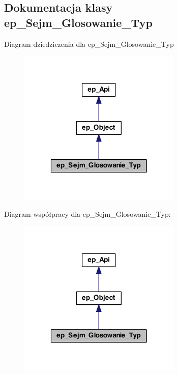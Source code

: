 \hypertarget{classep___sejm___glosowanie___typ}{\subsection{Dokumentacja klasy ep\-\_\-\-Sejm\-\_\-\-Glosowanie\-\_\-\-Typ}
\label{classep___sejm___glosowanie___typ}
}


Diagram dziedziczenia dla ep\-\_\-\-Sejm\-\_\-\-Glosowanie\-\_\-\-Typ\nopagebreak
\begin{figure}[H]
\begin{center}
\leavevmode
\includegraphics[width=220pt]{classep___sejm___glosowanie___typ__inherit__graph}
\end{center}
\end{figure}


Diagram współpracy dla ep\-\_\-\-Sejm\-\_\-\-Glosowanie\-\_\-\-Typ\-:\nopagebreak
\begin{figure}[H]
\begin{center}
\leavevmode
\includegraphics[width=220pt]{classep___sejm___glosowanie___typ__coll__graph}
\end{center}
\end{figure}
